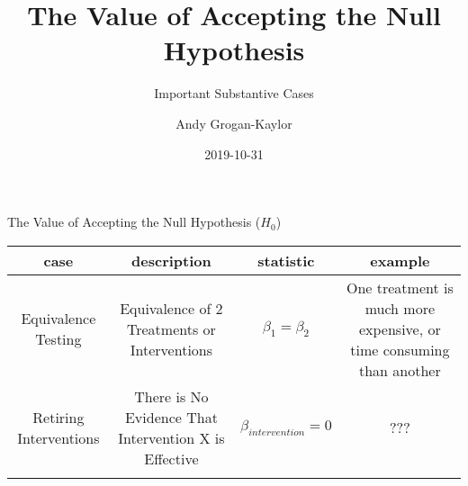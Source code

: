 \documentclass[ignorenonframetext,]{beamer}
\title{The Value of Accepting the Null Hypothesis}
\subtitle{Important Substantive Cases}
\author{Andy Grogan-Kaylor}
\institute{University of Michigan}
\date{2019-10-31}
\begin{document}
\frame{\titlepage}

\begin{frame}{The Value of Accepting the Null Hypothesis (\(H_0\))}
\protect\hypertarget{the-value-of-accepting-the-null-hypothesis-h_0}{}

\begin{longtable}[]{@{}cccc@{}}
\toprule
\begin{minipage}[b]{0.21\columnwidth}\centering
case\strut
\end{minipage} & \begin{minipage}[b]{0.20\columnwidth}\centering
description\strut
\end{minipage} & \begin{minipage}[b]{0.25\columnwidth}\centering
statistic\strut
\end{minipage} & \begin{minipage}[b]{0.20\columnwidth}\centering
example\strut
\end{minipage}\tabularnewline
\midrule
\endhead
\begin{minipage}[t]{0.21\columnwidth}\centering
Equivalence Testing\strut
\end{minipage} & \begin{minipage}[t]{0.20\columnwidth}\centering
Equivalence of 2 Treatments or Interventions\strut
\end{minipage} & \begin{minipage}[t]{0.25\columnwidth}\centering
\(β_1 = β_2\)\strut
\end{minipage} & \begin{minipage}[t]{0.20\columnwidth}\centering
One treatment is much more expensive, or time consuming than
another\strut
\end{minipage}\tabularnewline
\begin{minipage}[t]{0.21\columnwidth}\centering
Retiring Interventions\strut
\end{minipage} & \begin{minipage}[t]{0.20\columnwidth}\centering
There is No Evidence That Intervention X is Effective\strut
\end{minipage} & \begin{minipage}[t]{0.25\columnwidth}\centering
\(β_{intervention} = 0\)\strut
\end{minipage} & \begin{minipage}[t]{0.20\columnwidth}\centering
???\strut
\end{minipage}\tabularnewline
\begin{minipage}[t]{0.21\columnwidth}\centering

\end{minipage}
\end{longtable}
\end{frame}
\end{document}
